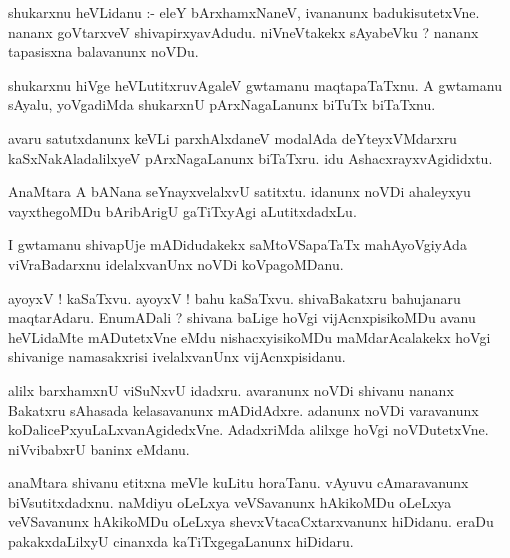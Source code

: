 \documentclass{article}
\begin{document}
\begin{mn}
shukarxnu  heVLidanu :- eleY  bArxhamxNaneV,  ivananunx  badukisutetxVne.  nananx  goVtarxveV  shivapirxyavAdudu.  
niVneVtakekx  sAyabeVku ?  nananx  tapasisxna  balavanunx  noVDu.
\end{mn}

\begin{mn}
shukarxnu  hiVge  heVLutitxruvAgaleV  gwtamanu  maqtapaTaTxnu.  A  gwtamanu  sAyalu,  yoVgadiMda  
shukarxnU  pArxNagaLanunx  biTuTx biTaTxnu.
\end{mn}

\begin{mn}
avaru  satutxdanunx  keVLi  parxhAlxdaneV  modalAda  deYteyxVMdarxru  kaSxNakAladalilxyeV  
pArxNagaLanunx  biTaTxru.  idu  AshacxrayxvAgididxtu.
\end{mn}

\begin{mn}
AnaMtara  A  bANana  seYnayxvelalxvU  satitxtu.  idanunx  noVDi  ahaleyxyu  vayxthegoMDu  
bAribArigU  gaTiTxyAgi  aLutitxdadxLu.
\end{mn}

\begin{mn}
I  gwtamanu  shivapUje  mADidudakekx  saMtoVSapaTaTx   mahAyoVgiyAda  viVraBadarxnu  
idelalxvanUnx  noVDi  koVpagoMDanu.
\end{mn}

\begin{mn}
ayoyxV !  kaSaTxvu.  ayoyxV !  bahu  kaSaTxvu.  shivaBakatxru  bahujanaru  maqtarAdaru.  EnumADali ?  
shivana  baLige  hoVgi  vijAcnxpisikoMDu  avanu  heVLidaMte  mADutetxVne  eMdu  nishacxyisikoMDu  
maMdarAcalakekx  hoVgi  shivanige  namasakxrisi  ivelalxvanUnx  vijAcnxpisidanu.
\end{mn}

\begin{mn}
alilx  barxhamxnU  viSuNxvU  idadxru.  avaranunx  noVDi  shivanu  nananx  Bakatxru  sAhasada  kelasavanunx  
mADidAdxre.  adanunx  noVDi  varavanunx  koDalicePxyuLaLxvanAgidedxVne.  AdadxriMda  alilxge  hoVgi  
noVDutetxVne. niVvibabxrU  baninx  eMdanu.
\end{mn}

\begin{mn}
anaMtara  shivanu  etitxna  meVle  kuLitu  horaTanu.  vAyuvu  cAmaravanunx  biVsutitxdadxnu.  naMdiyu  
oLeLxya  veVSavanunx  hAkikoMDu  oLeLxya  veVSavanunx  hAkikoMDu  oLeLxya  shevxVtacaCxtarxvanunx  hiDidanu.  
eraDu  pakakxdaLilxyU  cinanxda  kaTiTxgegaLanunx  hiDidaru.
\end{mn}
\end{document}

